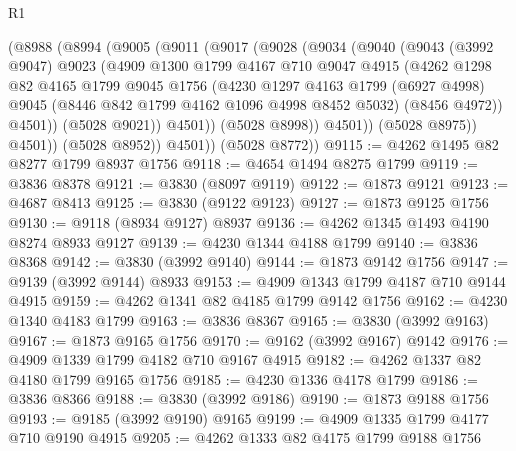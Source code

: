 \begin{lexlean}{R1}
\begin{coremodule}
            (@8988
              (@8994
                (@9005
                  (@9011
                    (@9017
                      (@9028
                        (@9034
                          (@9040
                            (@9043
                              (@3992 @9047)
                              @9023
                              (@4909
                                @1300
                                @1799
                                @4167
                                @710
                                @9047
                                @4915
                                (@4262
                                  @1298
                                  @82
                                  @4165
                                  @1799
                                  @9045
                                  @1756
                                  (@4230
                                    @1297
                                    @4163
                                    @1799
                                    (@6927 @4998)
                                    @9045
                                    (@8446 @842 @1799 @4162 @1096 @4998 @8452 @5032)
                                    (@8456 @4972))
                                  @4501))
                              (@5028 @9021))
                            @4501))
                        (@5028 @8998))
                      @4501))
                  (@5028 @8975))
                @4501))
            (@5028 @8952))
          @4501))
      (@5028 @8772))
@9115 := @4262 @1495 @82 @8277 @1799 @8937 @1756
@9118 := @4654 @1494 @8275 @1799
@9119 := @3836 @8378
@9121 := @3830 (@8097 @9119)
@9122 := @1873 @9121
@9123 := @4687 @8413
@9125 := @3830 (@9122 @9123)
@9127 := @1873 @9125 @1756
@9130 := @9118 (@8934 @9127) @8937
@9136 := @4262 @1345 @1493 @4190 @8274 @8933 @9127
@9139 := @4230 @1344 @4188 @1799
@9140 := @3836 @8368
@9142 := @3830 (@3992 @9140)
@9144 := @1873 @9142 @1756
@9147 := @9139 (@3992 @9144) @8933
@9153 := @4909 @1343 @1799 @4187 @710 @9144 @4915
@9159 := @4262 @1341 @82 @4185 @1799 @9142 @1756
@9162 := @4230 @1340 @4183 @1799
@9163 := @3836 @8367
@9165 := @3830 (@3992 @9163)
@9167 := @1873 @9165 @1756
@9170 := @9162 (@3992 @9167) @9142
@9176 := @4909 @1339 @1799 @4182 @710 @9167 @4915
@9182 := @4262 @1337 @82 @4180 @1799 @9165 @1756
@9185 := @4230 @1336 @4178 @1799
@9186 := @3836 @8366
@9188 := @3830 (@3992 @9186)
@9190 := @1873 @9188 @1756
@9193 := @9185 (@3992 @9190) @9165
@9199 := @4909 @1335 @1799 @4177 @710 @9190 @4915
@9205 := @4262 @1333 @82 @4175 @1799 @9188 @1756

\end{coremodule}
\end{lexlean}
